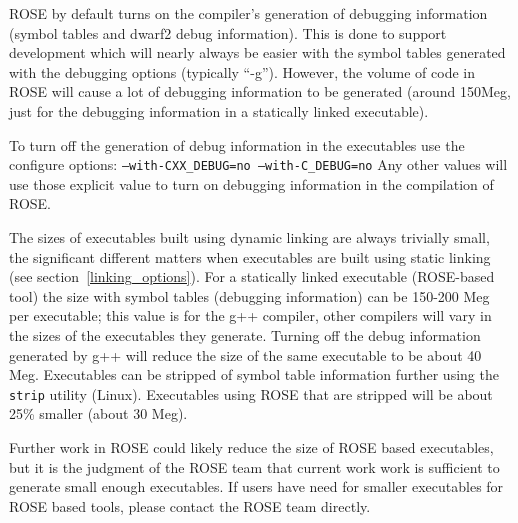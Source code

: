    ROSE by default turns on the compiler's generation of debugging information
(symbol tables and dwarf2 debug information). 
This is done to support development which will nearly always be easier with
the symbol tables generated with the debugging options (typically ``-g'').
However, the volume of code in ROSE will cause a lot of debugging information
to be generated (around 150Meg, just for the debugging information in a 
statically linked executable).

To turn off the generation of debug information in the executables use the
configure options: {\tt --with-CXX\_DEBUG=no --with-C\_DEBUG=no}  Any other
values will use those explicit value to turn on debugging information in
the compilation of ROSE.

The sizes of executables built using dynamic linking are always trivially small,
the significant different matters when executables are built using static linking
(see section~\ref{linking_options}).  For a statically linked executable 
(ROSE-based tool) the size with symbol tables (debugging information) can be
150-200 Meg per executable; this value is for the g++ compiler, other compilers
will vary in the sizes of the executables they generate.  Turning off the 
debug information generated by g++ will reduce the size of the same executable
to be about 40 Meg.  Executables can be stripped of symbol table information
further using the {\tt strip} utility (Linux).  Executables using ROSE that are stripped
will be about 25\% smaller (about 30 Meg).

   Further work in ROSE could likely reduce the size of ROSE based executables,
but it is the judgment of the ROSE team that current work work is sufficient to
generate small enough executables.  If users have need for smaller executables
for ROSE based tools, please contact the ROSE team directly.
